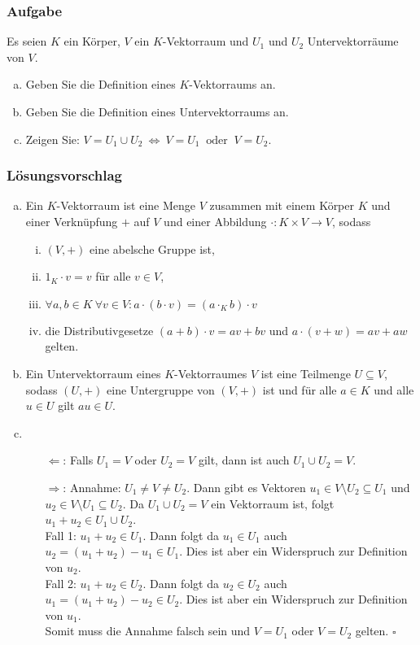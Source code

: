 \documentclass[a4paper,11pt]{scrartcl}
\newcounter{auf}
\newcommand{\Aufgabe}%
        {\addtocounter{auf}{1} \subsubsection*{\rmfamily  Aufgabe \theauf \hspace{1em}} }
\begin{document}
\newpage
\Aufgabe

Es seien $K$ ein Körper, $V$ ein $K$-Vektorraum und $U_1$ und $U_2$
Untervektorräume von $V.$

\begin{enumerate}[a)]
\item Geben Sie die Definition eines $K$-Vektorraums an.
\item Geben Sie die Definition eines Untervektorraums an.
\item Zeigen Sie: $V=U_1\cup U_2  \ \Longleftrightarrow \ V=U_1\ \text{ oder }\ V=U_2.$
\end{enumerate}
%
%
\subsubsection*{Lösungsvorschlag}
\begin{enumerate}[a)]
\item Ein $K$-Vektorraum ist eine Menge $V$ zusammen mit einem Körper $K$ und einer Verknüpfung $+$ auf $V$ und einer Abbildung $\cdot:K\times V \to V$, sodass
\begin{enumerate}[i)]
\item $(V,+)$ eine abelsche Gruppe ist,
\item $1_K\cdot v=v$ für alle $v\in V$,
\item $\forall a,b \in K \ \forall v \in V: a\cdot (b \cdot v)=(a\cdot_K b)\cdot v$
\item die Distributivgesetze $(a+b)\cdot v=av+bv$ und $a\cdot (v+w)=av+aw$ gelten.
\end{enumerate}
\item Ein Untervektorraum eines $K$-Vektorraumes $V$ ist eine Teilmenge $U \subseteq V$, sodass $(U,+)$ eine Untergruppe von $(V,+)$ ist und für alle $a\in K$ und alle $u\in U$ gilt $au \in U$.
\item 
\begin{itemize}
\item[$\Leftarrow$:] Falls $U_1=V$ oder $U_2=V$ gilt, dann ist auch $U_1\cup U_2=V$.
\item[$\Rightarrow$:] Annahme: $U_1\ne V \ne U_2$. Dann gibt es Vektoren $u_1 \in V\setminus U_2 \subseteq U_1$ und $u_2 \in V\setminus U_1 \subseteq U_2$. Da $U_1 \cup U_2=V$ ein Vektorraum ist, folgt $u_1+u_2 \in U_1\cup U_2$.\\
Fall 1: $u_1+u_2 \in U_1$. Dann folgt da $u_1 \in U_1$ auch $u_2=(u_1+u_2)-u_1 \in U_1$. Dies ist aber ein Widerspruch zur Definition von $u_2$.\\
Fall 2: $u_1+u_2 \in U_2$. Dann folgt da $u_2 \in U_2$ auch $u_1=(u_1+u_2)-u_2 \in U_2$. Dies ist aber ein Widerspruch zur Definition von $u_1$.\\
Somit muss die Annahme falsch sein und $V=U_1$ oder $V=U_2$ gelten. \hfill $\square$
\end{itemize}
\end{enumerate}
\end{document}
